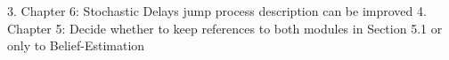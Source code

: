3. Chapter 6: Stochastic Delays jump process description can be improved
4. Chapter 5: Decide whether to keep references to both modules in Section 5.1 or only to Belief-Estimation